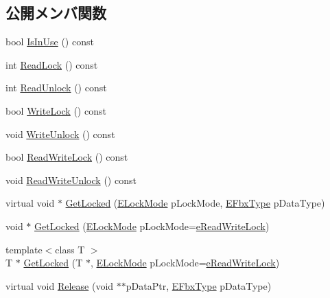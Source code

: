 \subsection*{公開メンバ関数}
\begin{DoxyCompactItemize}
\item 
bool \hyperlink{class_fbx_layer_element_array_a83e174dd9818d314a274bd87f7b9aa38}{Is\+In\+Use} () const
\item 
int \hyperlink{class_fbx_layer_element_array_afb3f283bed4e92d60488f582bd58bf80}{Read\+Lock} () const
\item 
int \hyperlink{class_fbx_layer_element_array_a75a18c8aecb5dc8c68c05c02bd54d7f4}{Read\+Unlock} () const
\item 
bool \hyperlink{class_fbx_layer_element_array_a828b1e27e5025c726bdc15b983522e4e}{Write\+Lock} () const
\item 
void \hyperlink{class_fbx_layer_element_array_a519b1b44abd526e00c6ee9e4f3a38e2d}{Write\+Unlock} () const
\item 
bool \hyperlink{class_fbx_layer_element_array_ab4293e9a5089b1bccdb2843ee6ff30fb}{Read\+Write\+Lock} () const
\item 
void \hyperlink{class_fbx_layer_element_array_a172d8f3872d50f7dfcdfd8f446cdcf3c}{Read\+Write\+Unlock} () const
\item 
virtual void $\ast$ \hyperlink{class_fbx_layer_element_array_a34ac50b866b0615109329c114e612b83}{Get\+Locked} (\hyperlink{class_fbx_layer_element_array_a8968b1fb337f924d0e9ca87302b54d70}{E\+Lock\+Mode} p\+Lock\+Mode, \hyperlink{fbxpropertytypes_8h_a73913a5ddfb20e57c6f25e9e6784bd92}{E\+Fbx\+Type} p\+Data\+Type)
\item 
void $\ast$ \hyperlink{class_fbx_layer_element_array_abd1fe9d5f32d6b07aa451e698a666819}{Get\+Locked} (\hyperlink{class_fbx_layer_element_array_a8968b1fb337f924d0e9ca87302b54d70}{E\+Lock\+Mode} p\+Lock\+Mode=\hyperlink{class_fbx_layer_element_array_a8968b1fb337f924d0e9ca87302b54d70afb510a1a3f85e5a4294bd956f5f936f9}{e\+Read\+Write\+Lock})
\item 
{\footnotesize template$<$class T $>$ }\\T $\ast$ \hyperlink{class_fbx_layer_element_array_a30fa9915279366bc14c76fd656b42d61}{Get\+Locked} (T $\ast$, \hyperlink{class_fbx_layer_element_array_a8968b1fb337f924d0e9ca87302b54d70}{E\+Lock\+Mode} p\+Lock\+Mode=\hyperlink{class_fbx_layer_element_array_a8968b1fb337f924d0e9ca87302b54d70afb510a1a3f85e5a4294bd956f5f936f9}{e\+Read\+Write\+Lock})
\item 
virtual void \hyperlink{class_fbx_layer_element_array_a574fce5860ae84a77c15d18bf3a2cd87}{Release} (void $\ast$$\ast$p\+Data\+Ptr, \hyperlink{fbxpropertytypes_8h_a73913a5ddfb20e57c6f25e9e6784bd92}{E\+Fbx\+Type} p\+Data\+Type)
$$
\end{DoxyCompactItemize}

